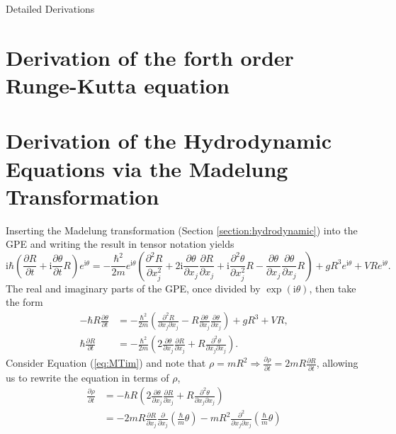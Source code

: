 \begin{chapter}{Detailed Derivations\label{app:App2}}
\section{\label{appsection:rk4deriv} Derivation of the forth order Runge-Kutta equation}

\section{\label{appsection:madtrans} Derivation of the Hydrodynamic Equations via the Madelung Transformation}
Inserting the Madelung transformation (Section \ref{section:hydrodynamic}) into the GPE and writing the result in tensor notation yields
\begin{equation*}
  \mathrm{i}\hbar\left( \frac{\partial R}{\partial t} + \mathrm{i}\frac{\partial \theta}{\partial t} R \right)e^{\mathrm{i}\theta} =
  -\frac{\hbar^2}{2m}e^{\mathrm{i}\theta}\left( \frac{\partial^2 R}{\partial x_j^2} + 2\mathrm{i}\frac{\partial \theta}{\partial x_j}\frac{\partial R}{\partial x_j}+
  \mathrm{i}\frac{\partial^2 \theta}{\partial x_j^2}R -  \frac{\partial \theta}{\partial x_j}\frac{\partial \theta}{\partial x_j} R  \right) + gR^3e^{\mathrm{i}\theta} + VRe^{\mathrm{i}\theta}.
\end{equation*}
The real and imaginary parts of the GPE, once divided by $\exp (\mathrm{i}\theta)$, then take the form
\begin{align}
  -\hbar R \frac{\partial \theta}{\partial t} &= -\frac{\hbar^2}{2m}\left( \frac{\partial^2 R}{\partial x_j \partial x_j} - R \frac{\partial \theta}{\partial x_j}\frac{\partial \theta}{\partial x_j}  \right) + gR^3 + VR, \label{eq:MTre}\\
  \hbar \frac{\partial R}{\partial t} &= -\frac{\hbar^2}{2m}\left( 2\frac{\partial \theta}{\partial x_j}\frac{\partial R}{\partial x_j} + R \frac{\partial^2 \theta}{\partial x_j \partial x_j} \right).
  \label{eq:MTim}
\end{align}
Consider Equation (\ref{eq:MTim}) and note that $\rho = mR^2 \Rightarrow \frac{\partial \rho}{\partial t} = 2mR\frac{\partial R}{\partial t}$, allowing us to rewrite the equation in terms of $\rho$,
\begin{align*}
  \frac{\partial \rho}{\partial t} &= -\hbar R\left( 2 \frac{\partial \theta}{\partial x_j} \frac{\partial R}{\partial x_j} + R \frac{\partial^2 \theta}{\partial x_j\partial x_j} \right)\\
  &= -2mR\frac{\partial R}{\partial x_j}\frac{\partial}{\partial x_j}\left( \frac{\hbar}{m} \theta \right) - mR^2 \frac{\partial^2}{\partial x_j \partial x_j}\left(\frac{\hbar}{m}\theta \right)\\

\end{align*}
\end{chapter}
